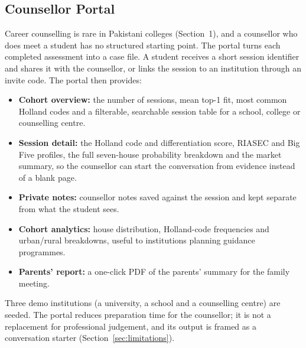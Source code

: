 \subsection{Counsellor Portal}
Career counselling is rare in Pakistani colleges (Section~1), and a counsellor
who does meet a student has no structured starting point. The portal turns
each completed assessment into a case file. A student receives a short
session identifier and shares it with the counsellor, or links the session to
an institution through an invite code. The portal then provides:
\begin{itemize}
  \item \textbf{Cohort overview:} the number of sessions, mean top-1 fit,
        most common Holland codes and a filterable, searchable session table
        for a school, college or counselling centre.
  \item \textbf{Session detail:} the Holland code and differentiation score,
        RIASEC and Big Five profiles, the full seven-house probability
        breakdown and the market summary, so the counsellor can start the
        conversation from evidence instead of a blank page.
  \item \textbf{Private notes:} counsellor notes saved against the session
        and kept separate from what the student sees.
  \item \textbf{Cohort analytics:} house distribution, Holland-code
        frequencies and urban/rural breakdowns, useful to institutions
        planning guidance programmes.
  \item \textbf{Parents' report:} a one-click PDF of the parents' summary
        for the family meeting.
\end{itemize}
Three demo institutions (a university, a school and a counselling centre) are
seeded. The portal reduces preparation time for the counsellor; it is not a
replacement for professional judgement, and its output is framed as a
conversation starter (Section~\ref{sec:limitations}).

